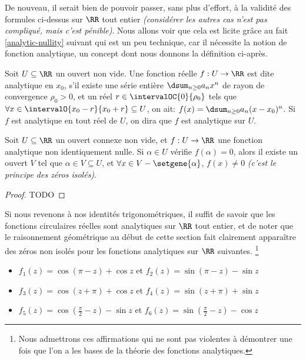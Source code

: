De nouveau, il serait bien de pouvoir passer, sans plus d'effort, à la validité des formules ci-dessus sur $\RR$ tout entier \emph{(considérer les autres cas n'est pas compliqué, mais c'est pénible)}.
%
Nous allons voir que cela est licite grâce au fait \ref{analytic-nullity} suivant qui est un peu technique, car il nécessite la notion de fonction analytique, un concept dont nous donnons la définition ci-après.


\begin{defi}
    Soit $U \subseteq \RR$ un ouvert non vide.
	Une fonction réelle $f: U \rightarrow \RR$ est dite analytique en $x_0$, 
	s'il existe
	une série entière $\dsum_{n \geq 0} a_n x^n$
	de rayon de convergence $\rho_0 > 0$,
	et
	un réel $r \in \intervalOC{0}{\rho_0}$ tels que 
	$\forall x \in \intervalO{x_0 - r}{x_0 + r} \subseteq U$, on ait:
	$f(x) = \dsum_{n \geq 0} a_n (x - x_0)^n$.
	Si $f$ est analytique en tout réel de $U$, on dira que $f$ est analytique sur $U$.
\end{defi}



\begin{fact} \label{analytic-nullity}
    Soit $U \subseteq \RR$ un ouvert connexe non vide,
    et
    $f: U \rightarrow \RR$ une fonction analytique non identiquement nulle.
	Si $\alpha \in U$ vérifie $f(\alpha) = 0$,
	alors il existe un ouvert $V$ tel que 
	$\alpha \in V \subseteq U$,
	et
	$\forall x \in V - \setgene{\alpha}$, $f(x) \neq 0$ 
	\emph{(c'est le principe des zéros isolés)}. 
\end{fact}


\begin{proof}
	TODO
\end{proof}








\newpage

Si nous revenons à nos identités trigonométriques, il suffit de savoir que les fonctions circulaires réelles sont analytiques sur $\RR$ tout entier, et de noter que le raisonnement géométrique au début de cette section fait clairement apparaître des zéros non isolés pour les fonctions analytiques sur $\RR$ suivantes.%
\footnote{
	Nous admettrons ces affirmations qui ne sont pas violentes à démontrer une fois que l'on a les bases de la théorie des fonctions analytiques.
}
%
\begin{itemize}[label=\small\textbullet]
	\item $f_1(z) = \cos (\pi - z) + \cos z$ 
	   et $f_2(z) = \sin (\pi - z) - \sin z$ 

	\smallskip
	\item $f_3(z) =\cos (z + \pi) + \cos z$ 
	   et $f_4(z) =\sin (z + \pi) + \sin z$

	\smallskip
	\item $f_5(z) =\cos \left( \frac{\pi}{2} - z \right) - \sin z$ 
	   et $f_6(z) =\sin \left( \frac{\pi}{2} - z \right) - \cos z$ 
\end{itemize}


